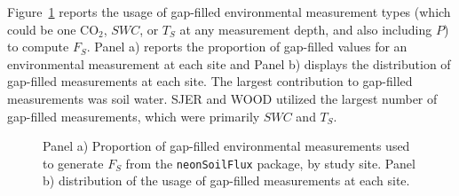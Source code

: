 \documentclass[
  letterpaper,
  DIV=11,
  numbers=noendperiod]{scrartcl}
\begin{document}
Figure~\ref{fig-gap-filled-stats} reports the usage of gap-filled
environmental measurement types (which could be one CO\(_{2}\), \(SWC\),
or \(T_{S}\) at any measurement depth, and also including \(P\)) to
compute \(F_{S}\). Panel a) reports the proportion of gap-filled values
for an environmental measurement at each site and Panel b) displays the
distribution of gap-filled measurements at each site. The largest
contribution to gap-filled measurements was soil water. SJER and WOOD
utilized the largest number of gap-filled measurements, which were
primarily \(SWC\) and \(T_{S}\).

\begin{figure}


\caption{\label{fig-gap-filled-stats}Panel a) Proportion of gap-filled
environmental measurements used to generate \(F_{S}\) from the
\texttt{neonSoilFlux} package, by study site. Panel b) distribution of
the usage of gap-filled measurements at each site.}

\end{figure}%
\end{document}
